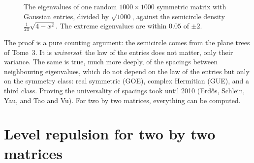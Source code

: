 \begin{figure}[ht]
\centering
{}
\caption{The eigenvalues of one random $1000\times1000$ symmetric matrix with Gaussian entries, divided by $\sqrt{1000}$, against the semicircle
density $\frac1{2\pi}\sqrt{4-x^2}$. The extreme eigenvalues are within $0.05$ of $\pm2$.}
\label{fig:semicircle}
\end{figure}

The proof is a pure counting argument: the semicircle comes from the plane trees of Tome~3. It is \emph{universal}: the law of the entries does not
matter, only their variance. The same is true, much more deeply, of the spacings between neighbouring eigenvalues, which do not depend on the law of
the entries but only on the symmetry class: real symmetric (GOE), complex Hermitian (GUE), and a third class. Proving the universality of spacings
took until 2010 (Erd\H{o}s, Schlein, Yau, and Tao and Vu). For two by two matrices, everything can be computed.

\section{Level repulsion for two by two matrices}


